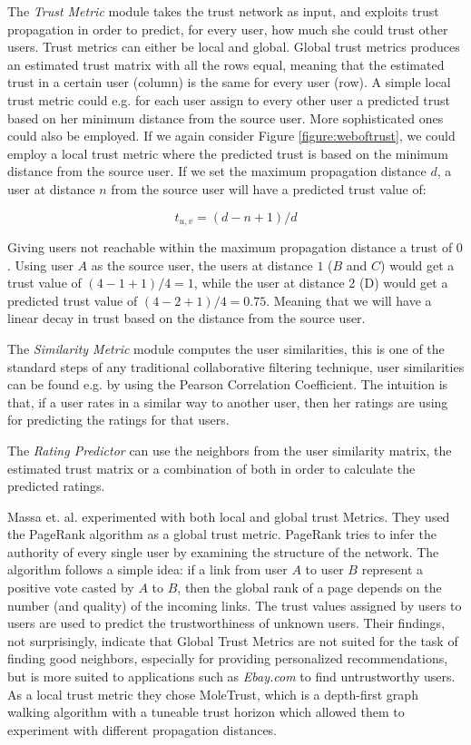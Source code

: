 The \emph{Trust Metric} module takes the trust network as input, and exploits
trust propagation in order to predict, for every user, how much she could trust
other users. Trust metrics can either be local and global. Global trust metrics
produces an estimated trust matrix with all the rows equal, meaning that the
estimated trust in a certain user (column) is the same for every user (row). A
simple local trust metric could e.g. for each user assign to every other user a
predicted trust based on her minimum distance from the source user. More
sophisticated ones could also be employed. If we again consider Figure
\ref{figure:weboftrust}, we could employ a local trust metric where the
predicted trust is based on the minimum distance from the source user. If we
set the maximum propagation distance $d$, a user at distance $n$ from the
source user will have a predicted trust value of:

\begin{equation}
t_{u,v} = (d-n+1)/d
\end{equation}

Giving users not reachable within the maximum propagation distance a trust of
$0$. Using user $A$ as the source user, the users at distance $1$ ($B$ and $C$)
would get a trust value of $(4-1+1)/4 = 1$, while the user at distance 2 (D)
would get a predicted trust value of $(4-2+1)/4 = 0.75$. Meaning that we will
have a linear decay in trust based on the distance from the source user.

The \emph{Similarity Metric} module computes the user similarities, this is one
of the standard steps of any traditional collaborative filtering technique,
user similarities can be found e.g. by using the Pearson Correlation
Coefficient. The intuition is that, if a user rates in a similar way to another
user, then her ratings are using for predicting the ratings for that users.

The \emph{Rating Predictor} can use the neighbors from the user similarity
matrix, the estimated trust matrix or a combination of both in order to
calculate the predicted ratings.


Massa et. al. \cite{Massa2007} experimented with both local and global trust
Metrics. They used the PageRank algorithm as a global trust metric. PageRank
tries to infer the authority of every single user by examining the structure of
the network. The algorithm follows a simple idea: if a link from user $A$ to user
$B$ represent a positive vote casted by $A$ to $B$, then the global rank of a page
depends on the number (and quality) of the incoming links. The trust values
assigned by users to users are used to predict the trustworthiness of unknown
users. Their findings, not surprisingly, indicate that Global Trust Metrics are
not suited for the task of finding good neighbors, especially for providing
personalized recommendations, but is more suited to applications such as \emph{Ebay.com} to find untrustworthy users. As a local trust metric they chose MoleTrust, which is a depth-first graph walking algorithm with a tuneable trust horizon
which allowed them to experiment with different propagation distances.



